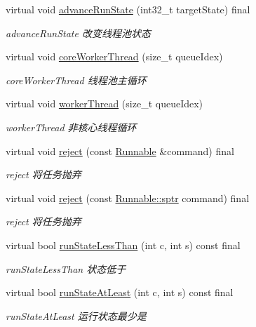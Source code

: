 \begin{DoxyCompactItemize}
virtual void \hyperlink{classThreadPoolExecutor_abaa3926310766a93b7fe1d83b77efdae}{advance\+Run\+State} (int32\+\_\+t target\+State) final
\begin{DoxyCompactList}\small\item\em advance\+Run\+State 改变线程池状态 \end{DoxyCompactList}\item 
virtual void \hyperlink{classThreadPoolExecutor_a5e40839bf4191b5eab9d81227ddb62c3}{core\+Worker\+Thread} (size\+\_\+t queue\+Idex)
\begin{DoxyCompactList}\small\item\em core\+Worker\+Thread 线程池主循环 \end{DoxyCompactList}\item 
virtual void \hyperlink{classThreadPoolExecutor_a844902ce61fb16b11a569b8ee56e80e9}{worker\+Thread} (size\+\_\+t queue\+Idex)
\begin{DoxyCompactList}\small\item\em worker\+Thread 非核心线程循环 \end{DoxyCompactList}\item 
virtual void \hyperlink{classThreadPoolExecutor_a14c4e3d786dcf22e858b11a95d2f77ef}{reject} (const \hyperlink{classRunnable}{Runnable} \&command) final
\begin{DoxyCompactList}\small\item\em reject 将任务抛弃 \end{DoxyCompactList}\item 
virtual void \hyperlink{classThreadPoolExecutor_a353e65b77bb3c0950ed79939473d4852}{reject} (const \hyperlink{classRunnable_abe8d3066c7305401d6f0aad8e70780f2}{Runnable\+::sptr} command) final
\begin{DoxyCompactList}\small\item\em reject 将任务抛弃 \end{DoxyCompactList}\item 
virtual bool \hyperlink{classThreadPoolExecutor_aa12a3efb879080453fb7abc486585698}{run\+State\+Less\+Than} (int c, int s) const final
\begin{DoxyCompactList}\small\item\em run\+State\+Less\+Than 状态低于 \end{DoxyCompactList}\item 
virtual bool \hyperlink{classThreadPoolExecutor_a44ee48ed44faa12fc6373074e9059e4e}{run\+State\+At\+Least} (int c, int s) const final
\begin{DoxyCompactList}\small\item\em run\+State\+At\+Least 运行状态最少是 \end{DoxyCompactList}\item 

\end{DoxyCompactItemize}
